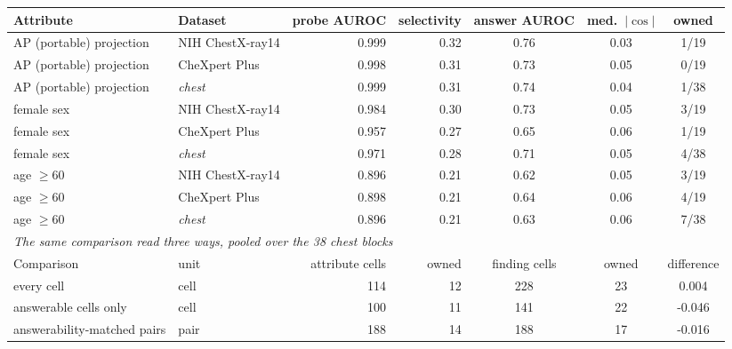 \documentclass{article}
\providecommand{\DIFaddendFL}{} %
\DeclareRobustCommand{\DIFaddendFL}{\DIFOaddendFL \let\includegraphics\DIFOincludegraphics} %
\begin{document}
\begin{table}[htbp]
{\begin{tabular}{llrrccc}
Attribute & Dataset & probe AUROC & selectivity & answer AUROC & med.\ $|\cos|$ & owned \\
\midrule
AP (portable) projection & NIH ChestX-ray14 & 0.999 & 0.32 & 0.76 & 0.03 & 1/19 \\
AP (portable) projection & CheXpert Plus & 0.998 & 0.31 & 0.73 & 0.05 & 0/19 \\
AP (portable) projection & \textit{chest} & 0.999 & 0.31 & 0.74 & 0.04 & 1/38 \\
female sex & NIH ChestX-ray14 & 0.984 & 0.30 & 0.73 & 0.05 & 3/19 \\
female sex & CheXpert Plus & 0.957 & 0.27 & 0.65 & 0.06 & 1/19 \\
female sex & \textit{chest} & 0.971 & 0.28 & 0.71 & 0.05 & 4/38 \\
age $\geq60$ & NIH ChestX-ray14 & 0.896 & 0.21 & 0.62 & 0.05 & 3/19 \\
age $\geq60$ & CheXpert Plus & 0.898 & 0.21 & 0.64 & 0.06 & 4/19 \\
age $\geq60$ & \textit{chest} & 0.896 & 0.21 & 0.63 & 0.06 & 7/38 \\
\midrule
\multicolumn{7}{l}{\textit{The same comparison read three ways, pooled over the 38 chest blocks}} \\
Comparison & unit & attribute cells & owned & finding cells & owned & difference \\
\midrule
every cell & cell & 114 & 12 & 228 & 23 & 0.004 \\
answerable cells only & cell & 100 & 11 & 141 & 22 & -0.046 \\
answerability-matched pairs & pair & 188 & 14 & 188 & 17 & -0.016 \\
\bottomrule
\end{tabular}}
\DIFaddendFL \end{table}
\end{document}
